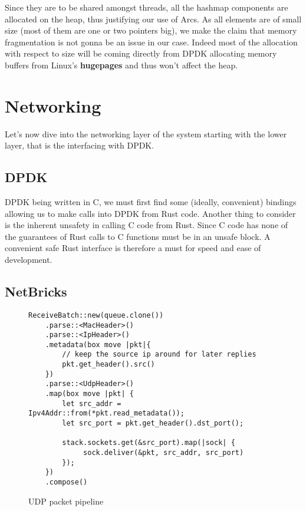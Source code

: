 Since they are to be shared amongst threads, all the hashmap
components are allocated on the heap, thus justifying our use of
Arcs. As all elements are of small size (most of them are one or two
pointers big), we make the claim that memory fragmentation is not
gonna be an issue in our case. Indeed most of the allocation with
respect to size will be coming directly from DPDK allocating memory
buffers from Linux's \textbf{hugepages} and thus won't affect the
heap.


\section{Networking}

Let's now dive into the networking layer of the system starting with
the lower layer, that is the interfacing with DPDK.

\subsection{DPDK}

DPDK being written in C, we must first find some (ideally, convenient)
bindings allowing us to make calls into DPDK from Rust code. Another
thing to consider is the inherent unsafety in calling C code from
Rust. Since C code has none of the guarantees of Rust calls to C
functions must be in an unsafe block. A convenient safe Rust interface
is therefore a must for speed and ease of development.


\subsection{NetBricks}

\begin{figure}[htb!]
\begin{lstlisting}
ReceiveBatch::new(queue.clone())
    .parse::<MacHeader>()
    .parse::<IpHeader>()
    .metadata(box move |pkt|{
        // keep the source ip around for later replies
        pkt.get_header().src()
    })
    .parse::<UdpHeader>()
    .map(box move |pkt| {
        let src_addr = Ipv4Addr::from(*pkt.read_metadata());
        let src_port = pkt.get_header().dst_port();

        stack.sockets.get(&src_port).map(|sock| {
             sock.deliver(&pkt, src_addr, src_port)
        });
    })
    .compose()
\end{lstlisting}

  \label{code:udp-pipeline}
  \caption{UDP packet pipeline}
\end{figure}

